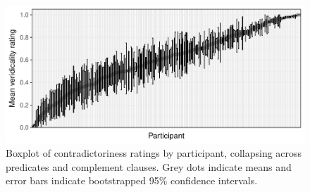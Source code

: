 \documentclass[11pt,fleqn]{article}
\newcommand{\6}{\mbox{$[\hspace*{-.6mm}[$}}
\newcommand{\9}{\mbox{$]\hspace*{-.6mm}]$}}
\begin{document}
%
%
%
%

\newpage

\begin{figure}[h!]
\centering


\includegraphics[width=12cm]{../results/2-veridicality/graphs/veridicality-subjmeans}
	

\caption{Boxplot of contradictoriness ratings by participant, collapsing across predicates and complement clauses. Grey dots indicate means and error bars indicate bootstrapped 95\% confidence intervals.}
\label{}
\end{figure}
\end{document}
